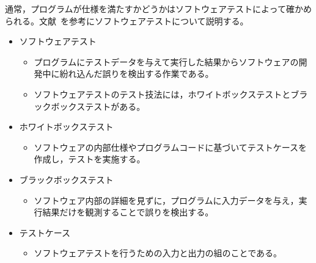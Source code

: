 \documentclass{tpu-sotu}
\begin{document}
通常，プログラムが仕様を満たすかどうかはソフトウェアテストによって確かめられる。文献~\cite{b0}を参考にソフトウェアテストについて説明する。
\begin{itemize}
\item ソフトウェアテスト
\begin{itemize}
\item プログラムにテストデータを与えて実行した結果からソフトウェアの開発中に紛れ込んだ誤りを検出する作業である。
\item ソフトウェアテストのテスト技法には，ホワイトボックステストとブラックボックステストがある。
\end{itemize}
\end{itemize}
\begin{itemize}
\item ホワイトボックステスト
\begin{itemize}
\item ソフトウェアの内部仕様やプログラムコードに基づいてテストケースを作成し，テストを実施する。
\end{itemize}
\end{itemize}
\begin{itemize}
\item ブラックボックステスト
\begin{itemize}
\item ソフトウェア内部の詳細を見ずに，プログラムに入力データを与え，実行結果だけを観測することで誤りを検出する。
\end{itemize}
\end{itemize}
\begin{itemize}
\item テストケース
\begin{itemize}
\item ソフトウェアテストを行うための入力と出力の組のことである。
\end{itemize}
\end{itemize}
\end{document}
